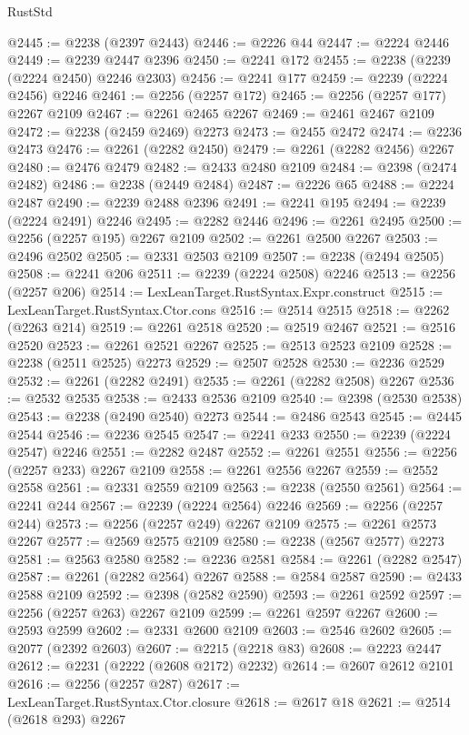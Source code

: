 \begin{lexlean}{RustStd}
\begin{coremodule}
@2445 := @2238 (@2397 @2443)
@2446 := @2226 @44
@2447 := @2224 @2446
@2449 := @2239 @2447 @2396
@2450 := @2241 @172
@2455 := @2238 (@2239 (@2224 @2450) @2246 @2303)
@2456 := @2241 @177
@2459 := @2239 (@2224 @2456) @2246
@2461 := @2256 (@2257 @172)
@2465 := @2256 (@2257 @177) @2267 @2109
@2467 := @2261 @2465 @2267
@2469 := @2461 @2467 @2109
@2472 := @2238 (@2459 @2469) @2273
@2473 := @2455 @2472
@2474 := @2236 @2473
@2476 := @2261 (@2282 @2450)
@2479 := @2261 (@2282 @2456) @2267
@2480 := @2476 @2479
@2482 := @2433 @2480 @2109
@2484 := @2398 (@2474 @2482)
@2486 := @2238 (@2449 @2484)
@2487 := @2226 @65
@2488 := @2224 @2487
@2490 := @2239 @2488 @2396
@2491 := @2241 @195
@2494 := @2239 (@2224 @2491) @2246
@2495 := @2282 @2446
@2496 := @2261 @2495
@2500 := @2256 (@2257 @195) @2267 @2109
@2502 := @2261 @2500 @2267
@2503 := @2496 @2502
@2505 := @2331 @2503 @2109
@2507 := @2238 (@2494 @2505)
@2508 := @2241 @206
@2511 := @2239 (@2224 @2508) @2246
@2513 := @2256 (@2257 @206)
@2514 := LexLeanTarget.RustSyntax.Expr.construct
@2515 := LexLeanTarget.RustSyntax.Ctor.cons
@2516 := @2514 @2515
@2518 := @2262 (@2263 @214)
@2519 := @2261 @2518
@2520 := @2519 @2467
@2521 := @2516 @2520
@2523 := @2261 @2521 @2267
@2525 := @2513 @2523 @2109
@2528 := @2238 (@2511 @2525) @2273
@2529 := @2507 @2528
@2530 := @2236 @2529
@2532 := @2261 (@2282 @2491)
@2535 := @2261 (@2282 @2508) @2267
@2536 := @2532 @2535
@2538 := @2433 @2536 @2109
@2540 := @2398 (@2530 @2538)
@2543 := @2238 (@2490 @2540) @2273
@2544 := @2486 @2543
@2545 := @2445 @2544
@2546 := @2236 @2545
@2547 := @2241 @233
@2550 := @2239 (@2224 @2547) @2246
@2551 := @2282 @2487
@2552 := @2261 @2551
@2556 := @2256 (@2257 @233) @2267 @2109
@2558 := @2261 @2556 @2267
@2559 := @2552 @2558
@2561 := @2331 @2559 @2109
@2563 := @2238 (@2550 @2561)
@2564 := @2241 @244
@2567 := @2239 (@2224 @2564) @2246
@2569 := @2256 (@2257 @244)
@2573 := @2256 (@2257 @249) @2267 @2109
@2575 := @2261 @2573 @2267
@2577 := @2569 @2575 @2109
@2580 := @2238 (@2567 @2577) @2273
@2581 := @2563 @2580
@2582 := @2236 @2581
@2584 := @2261 (@2282 @2547)
@2587 := @2261 (@2282 @2564) @2267
@2588 := @2584 @2587
@2590 := @2433 @2588 @2109
@2592 := @2398 (@2582 @2590)
@2593 := @2261 @2592
@2597 := @2256 (@2257 @263) @2267 @2109
@2599 := @2261 @2597 @2267
@2600 := @2593 @2599
@2602 := @2331 @2600 @2109
@2603 := @2546 @2602
@2605 := @2077 (@2392 @2603)
@2607 := @2215 (@2218 @83)
@2608 := @2223 @2447
@2612 := @2231 (@2222 (@2608 @2172) @2232)
@2614 := @2607 @2612 @2101
@2616 := @2256 (@2257 @287)
@2617 := LexLeanTarget.RustSyntax.Ctor.closure
@2618 := @2617 @18
@2621 := @2514 (@2618 @293) @2267

\end{coremodule}
\end{lexlean}
